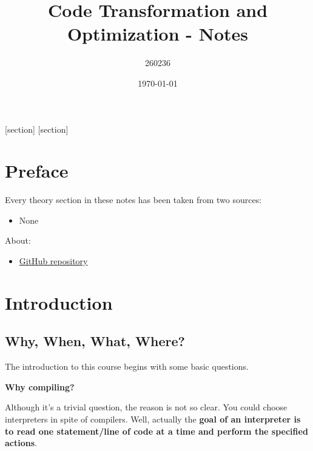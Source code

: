 \documentclass[a4paper]{article}
\newcommand{\definition}[1]{\textcolor{Red3}{\textbf{#1}}\index{#1}}
\begin{document}
    [section]
    [section]



    \author{260236}
	\title{Code Transformation and Optimization - Notes}
	\date{\printdayoff\today}
	\maketitle

	\newpage

    \section*{Preface}

    Every theory section in these notes has been taken from two sources:
    \begin{itemize}
        \item None
    \end{itemize}
    About:
    \begin{itemize}
        \item[\faIcon{github}] \href{https://github.com/PoliMI-HPC-E-notes-projects-AndreVale69/HPC-E-PoliMI-university-notes}{GitHub repository}
    \end{itemize}
    
    \newpage
	
	\tableofcontents
	
	\newpage

    \section{Introduction}

    \subsection{Why, When, What, Where?}

    The introduction to this course begins with some basic questions.

    \begin{flushleft}
        \large
        \textcolor{Red3}{\textbf{Why compiling?}}
    \end{flushleft}
    Although it's a trivial question, the reason is not so clear. You could choose interpreters in spite of compilers. Well, actually the \textbf{goal of an \definition{interpreter} is to read one statement/line of code at a time and perform the specified actions}.
\end{document}
